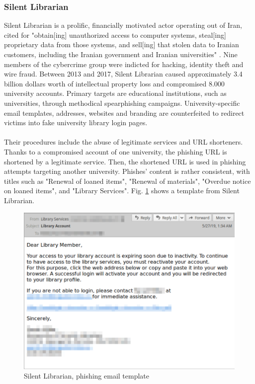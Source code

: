 \documentclass[a4paper]{article}
\begin{document}
\subsubsection{Silent Librarian}

Silent Librarian is a prolific, financially motivated actor operating out of Iran, cited for "obtain[ing] unauthorized access to computer systems, steal[ing] proprietary data from those systems, and sell[ing] that stolen data to Iranian customers, including the Iranian government and Iranian universities" \cite{article-silent-librarian}. Nine members of the cybercrime group were indicted for hacking, identity theft and wire fraud. Between 2013 and 2017, Silent Librarian caused approximately 3.4 billion dollars worth of intellectual property loss and compromised 8.000 university accounts. Primary targets are educational institutions, such as universities, through methodical spearphishing campaigns. University-specific email templates, addresses, websites and branding are counterfeited to redirect victims into fake university library login pages. 
\\ \\
Their procedures include the abuse of legitimate services and URL shorteners. Thanks to a compromised account of one university, the phishing URL is shortened by a legitimate service. Then, the shortened URL is used in phishing attempts targeting another university. Phishes' content is rather consistent, with titles such as "Renewal of loaned items", "Renewal of materials", "Overdue notice on loaned items", and "Library Services". Fig. \ref{sil-lib-template} shows a template from Silent Librarian.

\begin{figure}[ht!]
\centering
\includegraphics[scale=0.58]{images/reports/silent-librarian-lure.PNG}
\caption{Silent Librarian, phishing email template
\cite{article-silent-librarian}}
\label{sil-lib-template}
\end{figure}
\end{document}

